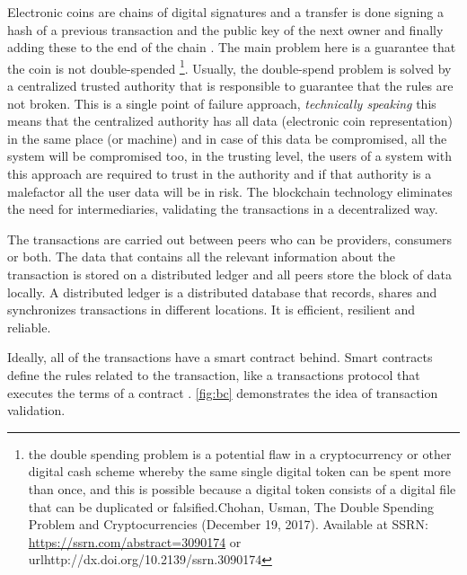 Electronic coins are chains of digital signatures and a transfer is done signing a hash of a previous transaction and the public key of the next owner and finally adding these to the end of the chain \cite{bitcoin}. The main problem here is a guarantee that the coin is not double-spended \footnote{the ​double spending problem ​is a potential flaw in a cryptocurrency or other digital cash scheme whereby the same single digital token can be spent more than once, and this is possible because a digital token consists of a digital file that can be duplicated or falsified.Chohan, Usman, The Double Spending Problem and Cryptocurrencies (December 19, 2017). Available at SSRN: \url{https://ssrn.com/abstract=3090174} or url{http://dx.doi.org/10.2139/ssrn.3090174}}. Usually, the double-spend problem is solved by a centralized trusted authority that is responsible to guarantee that the rules are not broken. This is a single point of failure approach, \textit{technically speaking} this means that the centralized authority has all data (electronic coin representation) in the same place (or machine) and in case of this data be compromised, all the system will be compromised too, in the trusting level, the users of a system with this approach are required to trust in the authority and if that authority is a malefactor all the user data will be in risk.  The blockchain technology eliminates the need for intermediaries, validating the transactions in a decentralized way. 


The transactions are carried out between peers who can be providers, consumers or both. The data that contains all the relevant information about the transaction is stored on a distributed ledger and all peers store the block of data locally. A distributed ledger is a distributed database that records, shares and synchronizes transactions in different locations. It is efficient, resilient and reliable. 


Ideally, all of the transactions have a smart contract behind. Smart contracts define the rules related to the transaction, like a transactions protocol that executes the terms of a contract \cite{SmartContracts}. \cref{fig:bc} demonstrates the idea of transaction validation.



